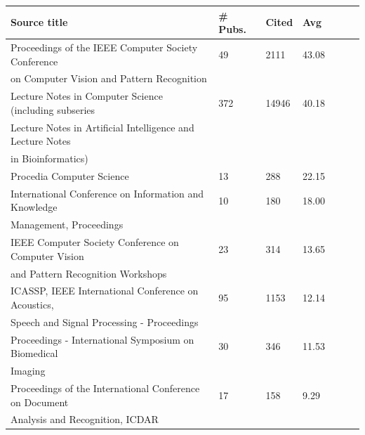 \begin{table}[ht]
    \begin{center}
    \begin{tabular*}{\textwidth}{@{\extracolsep{\fill}}lllllll@{\extracolsep{\fill}}}
        \toprule
        Source title & \# Pubs. & Cited & Avg \\
        \midrule
        Proceedings of the IEEE Computer Society Conference & 49 & 2111 & 43.08 \\
        \vspace{.2cm}on Computer Vision and Pattern Recognition &&& \\
        Lecture Notes in Computer Science (including subseries & 372 & 14946 & 40.18 \\
        Lecture Notes in Artificial Intelligence and Lecture Notes &&& \\ 
        \vspace{.2cm}in Bioinformatics) &&& \\

        \vspace{.2cm}Procedia Computer Science & 13 & 288 & 22.15 \\

        International Conference on Information and Knowledge & 10 & 180 & 18.00 \\
        \vspace{.2cm}Management, Proceedings &&& \\

        IEEE Computer Society Conference on Computer Vision & 23 & 314 & 13.65 \\
        \vspace{.2cm}and Pattern Recognition Workshops &&& \\

        ICASSP, IEEE International Conference on Acoustics, & 95 & 1153 & 12.14 \\
        \vspace{.2cm}Speech and Signal Processing - Proceedings &&& \\

        Proceedings - International Symposium on Biomedical & 30 & 346 & 11.53 \\
        \vspace{.2cm}Imaging &&& \\

        Proceedings of the International Conference on Document & 17 & 158 & 9.29 \\
        \vspace{.2cm}Analysis and Recognition, ICDAR &&& \\


\end{tabular*}
\end{center}
\end{table}
